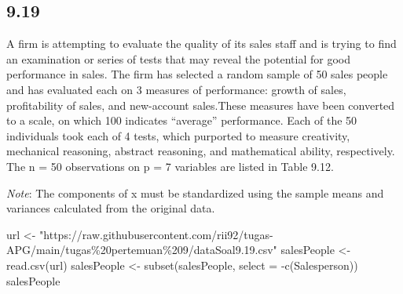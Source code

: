 \documentclass[
]{article}
\newenvironment{Shaded}{\begin{snugshade}}{\end{snugshade}}
\newcommand{\AttributeTok}[1]{\textcolor[rgb]{0.77,0.63,0.00}{#1}}
\newcommand{\FunctionTok}[1]{\textcolor[rgb]{0.00,0.00,0.00}{#1}}
\newcommand{\NormalTok}[1]{#1}
\newcommand{\OtherTok}[1]{\textcolor[rgb]{0.56,0.35,0.01}{#1}}
\newcommand{\SpecialCharTok}[1]{\textcolor[rgb]{0.00,0.00,0.00}{#1}}
\newcommand{\StringTok}[1]{\textcolor[rgb]{0.31,0.60,0.02}{#1}}
\begin{document}
\hypertarget{section-1}{%
\subsection{9.19}\label{section-1}}

A firm is attempting to evaluate the quality of its sales staff and is
trying to find an examination or series of tests that may reveal the
potential for good performance in sales. The firm has selected a random
sample of 50 sales people and has evaluated each on 3 measures of
performance: growth of sales, profitability of sales, and new-account
sales.These measures have been converted to a scale, on which 100
indicates ``average'' performance. Each of the 50 individuals took each
of 4 tests, which purported to measure creativity, mechanical reasoning,
abstract reasoning, and mathematical ability, respectively. The n = 50
observations on p = 7 variables are listed in Table 9.12.

\emph{Note}: The components of x must be standardized using the sample
means and variances calculated from the original data.

\begin{Shaded}
\begin{Highlighting}[]
\NormalTok{url }\OtherTok{\textless{}{-}} \StringTok{"https://raw.githubusercontent.com/rii92/tugas{-}APG/main/tugas\%20pertemuan\%209/dataSoal9.19.csv"}
\NormalTok{salesPeople }\OtherTok{\textless{}{-}} \FunctionTok{read.csv}\NormalTok{(url)}
\NormalTok{salesPeople }\OtherTok{\textless{}{-}} \FunctionTok{subset}\NormalTok{(salesPeople, }\AttributeTok{select =} \SpecialCharTok{{-}}\FunctionTok{c}\NormalTok{(Salesperson))}
\NormalTok{salesPeople}
\end{Highlighting}
\end{Shaded}
\end{document}
